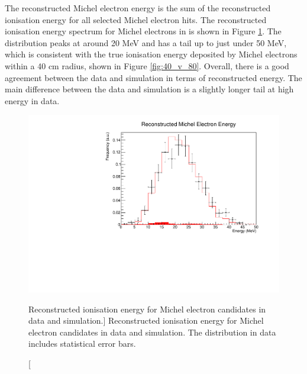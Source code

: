 The reconstructed Michel electron energy is the sum of the reconstructed
ionisation energy for all selected Michel electron hits. The reconstructed 
ionisation energy spectrum for Michel electrons in \protodune{} is shown in 
Figure \ref{fig:michel_ion_reco}. The distribution peaks at around 20 MeV and 
has a tail up to just under 50 MeV, which is consistent with the true 
ionisation energy deposited by Michel electrons within a 40 cm radius, shown 
in Figure \ref{fig:40_v_80}. Overall, there is a good agreement between the data
and simulation in terms of reconstructed energy. The main difference between the
data and simulation is a slightly longer tail at high energy in data.
\begin{figure}
	\centering
	\includegraphics[width=\textwidth]{figures/michel_ion_reco.pdf}
	\caption
	[Reconstructed ionisation energy for Michel electron candidates in
	\protodune{} data and simulation.]
	{ Reconstructed ionisation energy for Michel electron candidates in
	\protodune{} data and simulation. The distribution in data includes
	statistical error bars. }
	\label{fig:michel_ion_reco}
\end{figure}

